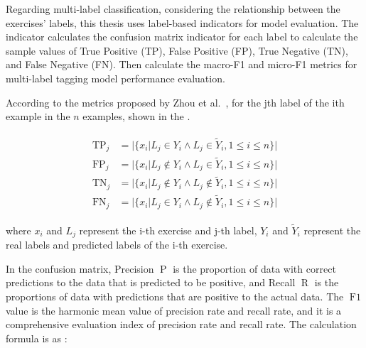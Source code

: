 
Regarding multi-label classification, considering the relationship between the exercises' labels, this thesis uses label-based indicators for model evaluation. The indicator calculates the confusion matrix indicator for each label to calculate the sample values of True Positive (TP), False Positive (FP), True Negative (TN), and False Negative (FN). Then calculate the macro-F1 and micro-F1 metrics for multi-label tagging model performance evaluation.

According to the metrics proposed by Zhou et al.~\cite{zhang2013review}, for the jth label of the ith example in the \(n\) examples, shown in the \eqname{\ref{fml:mlcm}}.

\begin{align}\label{fml:mlcm}
    \begin{split}
        \operatorname{TP}_j & =| \{x_i| L_j\in Y_{i}\wedge L_j \in \tilde{Y}_i , 1\leq i \leq n\}|       \\
        \operatorname{FP}_j & =| \{x_i| L_j\notin Y_{i}\wedge L_j \in \tilde{Y}_i , 1\leq i \leq n\}|    \\
        \operatorname{TN}_j & =| \{x_i| L_j\notin Y_{i}\wedge L_j \notin \tilde{Y}_i , 1\leq i \leq n\}| \\
        \operatorname{FN}_j & =| \{x_i| L_j\in Y_{i}\wedge L_j \notin \tilde{Y}_i , 1\leq i \leq n\}|
    \end{split}
\end{align}

where \(x_i\) and \(L_j\) represent the i-th exercise and j-th label, \(Y_i\) and \(\tilde{Y}_i\) represent the real labels and predicted labels of the i-th exercise.


In the confusion matrix, Precision \(\operatorname{P}\) is the proportion of data with correct predictions to the data that is predicted to be positive, and Recall \(\operatorname{R}\) is the proportions of data with predictions that are positive to the actual data. The \(\operatorname{F1}\) value is the harmonic mean value of precision rate and recall rate, and it is a comprehensive evaluation index of precision rate and recall rate. The calculation formula is as \eqname{\ref{fml:f1score}}:

